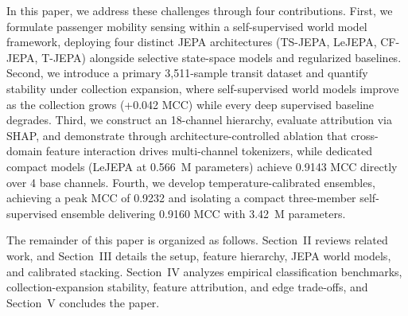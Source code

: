 In this paper, we address these challenges through four contributions. First, we formulate passenger mobility sensing within a self-supervised world model framework, deploying four distinct \ac{JEPA} architectures (\ac{TS-JEPA}, LeJEPA, CF-JEPA, T-JEPA) alongside selective state-space models and regularized baselines. Second, we introduce a primary 3,511-sample transit dataset and quantify stability under collection expansion, where self-supervised world models improve as the collection grows (+0.042 \ac{MCC}) while every deep supervised baseline degrades. Third, we construct an 18-channel hierarchy, evaluate attribution via \ac{SHAP}, and demonstrate through architecture-controlled ablation that cross-domain feature interaction drives multi-channel tokenizers, while dedicated compact models (LeJEPA at 0.566~M parameters) achieve 0.9143 \ac{MCC} directly over 4 base channels. Fourth, we develop temperature-calibrated ensembles, achieving a peak \ac{MCC} of 0.9232 and isolating a compact three-member self-supervised ensemble delivering 0.9160 \ac{MCC} with 3.42~M parameters.

The remainder of this paper is organized as follows. Section~II reviews related work, and Section~III details the setup, feature hierarchy, \ac{JEPA} world models, and calibrated stacking. Section~IV analyzes empirical classification benchmarks, collection-expansion stability, feature attribution, and edge trade-offs, and Section~V concludes the paper.
